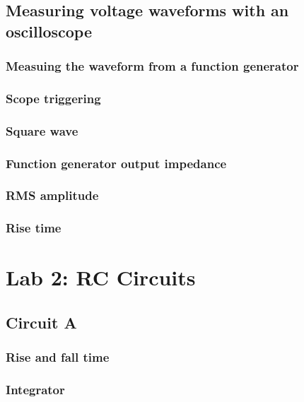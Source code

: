 \documentclass{article}
\begin{document}
\subsection{Measuring voltage waveforms with an oscilloscope}

\subsubsection{Measuing the waveform from a function generator}

\subsubsection{Scope triggering}

\subsubsection{Square wave}

\subsubsection{Function generator output impedance}

\subsubsection{RMS amplitude}

\subsubsection{Rise time}





\section{Lab 2: RC Circuits}

\subsection{Circuit A}

\subsubsection{Rise and fall time}

\subsubsection{Integrator}
\end{document}
